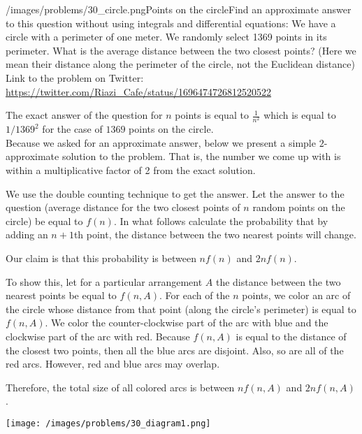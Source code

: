 \begin{problem}{/images/problems/30_circle.png}{Points on the circle}Find an approximate answer to this question without using integrals and differential equations:
We have a circle with a perimeter of one meter. We randomly select 1369 points in its perimeter. What is the average distance between the two closest points? (Here we mean their distance along the perimeter of the circle, not the Euclidean distance)\\[0.2cm]

Link to the problem on Twitter:  \url{https://twitter.com/Riazi_Cafe/status/1696474726812520522}\end{problem}
\begin{solution}
The exact answer of the question for $n$ points is equal to $\frac{1}{n^2}$ which is equal to $1/1369^2$ for the case of $1369$ points on the circle.\\[0.2cm]

Because we asked for an approximate answer, below we present a simple $2$-approximate solution to the problem. That is, the number we come up with is within a multiplicative factor of 2 from the exact solution.

We use the double counting technique to get the answer. Let the answer to the question (average distance for the two closest points of $n$ random points on the circle) be equal to $f(n)$. In what follows calculate the probability that by adding an $n+1$th point, the distance between the two nearest points will change.

Our claim is that this probability is between $nf(n)$ and $2nf(n)$.

To show this, let for a particular arrangement $A$ the distance between the two nearest points be equal to $f(n,A)$.
For each of the $n$ points, we color an arc of the circle whose distance from that point (along the circle's perimeter) is equal to $f(n,A)$.
We color the counter-clockwise part of the arc with blue and the clockwise part of the arc with red.
Because $f(n,A)$ is equal to the distance of the closest two points, then all the blue arcs are disjoint.
Also, so are all of the red arcs.
However, red and blue arcs may overlap.

Therefore, the total size of all colored arcs is between
$nf(n,A)$
and
$2nf(n,A)$.

\begin{center}
	\texttt{[image: /images/problems/30\_diagram1.png]}
\end{center}


\end{solution}
